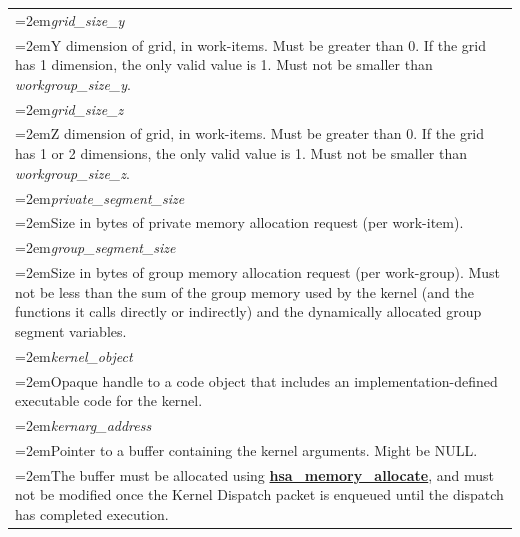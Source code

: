 \documentclass[final,oneside]{book}
\newcommand{\reffun}[1]{\textbf{#1}}
\newcommand{\reffld}[1]{\textit{#1}}
\begin{document}
\begin{longtable}{@{}>{\hangindent=2em}p{\textwidth}}
\hypertarget{hsa_\-kernel_\-dispatch_\-packet_\-t.grid_\-size_\-y}{\reffld{grid_\-size_\-y}}\\\hspace{2em}Y dimension of grid, in work-items. Must be greater than 0. If the grid has 1 dimension, the only valid value is 1. Must not be smaller than \textit{workgroup_\-size_\-y}.\\[2mm]
\hypertarget{hsa_\-kernel_\-dispatch_\-packet_\-t.grid_\-size_\-z}{\reffld{grid_\-size_\-z}}\\\hspace{2em}Z dimension of grid, in work-items. Must be greater than 0. If the grid has 1 or 2 dimensions, the only valid value is 1. Must not be smaller than \textit{workgroup_\-size_\-z}.\\[2mm]
\hypertarget{hsa_\-kernel_\-dispatch_\-packet_\-t.private_\-segment_\-size}{\reffld{private_\-segment_\-size}}\\\hspace{2em}Size in bytes of private memory allocation request (per work-item).\\[2mm]
\hypertarget{hsa_\-kernel_\-dispatch_\-packet_\-t.group_\-segment_\-size}{\reffld{group_\-segment_\-size}}\\\hspace{2em}Size in bytes of group memory allocation request (per work-group). Must not be less than the sum of the group memory used by the kernel (and the functions it calls directly or indirectly) and the dynamically allocated group segment variables.\\[2mm]
\hypertarget{hsa_\-kernel_\-dispatch_\-packet_\-t.kernel_\-object}{\reffld{kernel_\-object}}\\\hspace{2em}Opaque handle to a code object that includes an implementation-defined executable code for the kernel.\\[2mm]
\hypertarget{hsa_\-kernel_\-dispatch_\-packet_\-t.kernarg_\-address}{\reffld{kernarg_\-address}}\\\hspace{2em}Pointer to a buffer containing the kernel arguments. Might be NULL.\\
\hspace{2em}The buffer must be allocated using \hyperlink{group__memory_1ga39f7943b93aa2bb754726fc74d929426}{\reffun{hsa_\-memory_\-allocate}}, and must not be modified once the Kernel Dispatch packet is enqueued until the dispatch has completed execution.\\[2mm]

\end{longtable}
\end{document}
